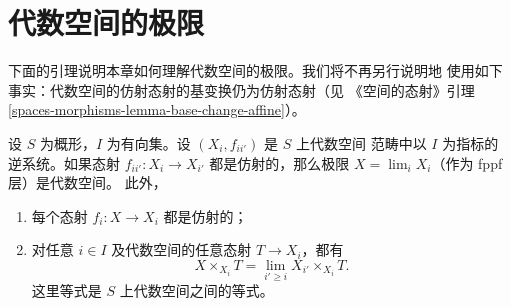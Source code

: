 \section{代数空间的极限}
\label{section-limits}

\noindent
下面的引理说明本章如何理解代数空间的极限。我们将不再另行说明地
使用如下事实：代数空间的仿射态射的基变换仍为仿射态射（见
《空间的态射》引理 \ref{spaces-morphisms-lemma-base-change-affine}）。

\begin{lemma}
\label{lemma-directed-inverse-system-has-limit}
设 $S$ 为概形，$I$ 为有向集。设 $(X_i,f_{ii'})$ 是 $S$ 上代数空间
范畴中以 $I$ 为指标的逆系统。如果态射 $f_{ii'}:X_i\to X_{i'}$
都是仿射的，那么极限 $X=\lim_iX_i$（作为 fppf 层）是代数空间。
此外，
\begin{enumerate}
\item 每个态射 $f_i:X\to X_i$ 都是仿射的；
\item 对任意 $i\in I$ 及代数空间的任意态射 $T\to X_i$，都有
$$
X \times_{X_i} T = \lim_{i' \geq i} X_{i'} \times_{X_i} T.
$$
这里等式是 $S$ 上代数空间之间的等式。
\end{enumerate}
\end{lemma}

